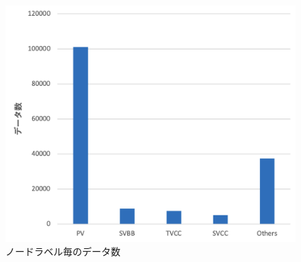 \begin{figure}[H]
	\begin{center}
 \includegraphics[keepaspectratio, scale=0.3]
 	{Figure/Flavortagging/imbalance.png}
 		\caption{ノードラベル毎のデータ数}
 		\label{node_imb}
	\end{center}
\end{figure}
